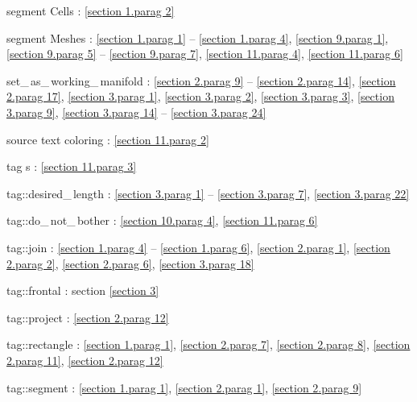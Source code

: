 \documentclass[a4paper]{scrreprt}
\def\numb{}
\newcommand\verm[1]{\textcolor{manif}{#1}}
\renewcommand\tt{\normalfont\ttfamily}
\begin{document}
\noindent
segment {\small\tt \verm{Cell}}s : \ref{\numb section 1.\numb parag 2}

\noindent
segment {\small\tt \verm{Mesh}}es :
\ref{\numb section 1.\numb parag 1} -- \ref{\numb section 1.\numb parag 4},
\ref{\numb section 9.\numb parag 1}, \ref{\numb section 9.\numb parag 5} --
\ref{\numb section 9.\numb parag 7}, \ref{\numb section 11.\numb parag 4},
\ref{\numb section 11.\numb parag 6}

\noindent
{\small\tt set\_\,as\_\,working\_\,manifold} :
\ref{\numb section 2.\numb parag 9} -- \ref{\numb section 2.\numb parag 14},
\ref{\numb section 2.\numb parag 17}, \ref{\numb section 3.\numb parag 1},
\ref{\numb section 3.\numb parag 2}, \ref{\numb section 3.\numb parag 3},
\ref{\numb section 3.\numb parag 9},
\ref{\numb section 3.\numb parag 14} -- \ref{\numb section 3.\numb parag 24}

\noindent
source text coloring : \ref{\numb section 11.\numb parag 2}

\noindent
{\small\tt\textcolor{tag}{tag}}\hskip0.5pt s : \ref{\numb section 11.\numb parag 3}
  
\noindent
{\small\tt\textcolor{tag}{tag}::desired\_\,length} :
\ref{\numb section 3.\numb parag 1} -- \ref{\numb section 3.\numb parag 7},
\ref{\numb section 3.\numb parag 22}

\noindent
{\small\tt\textcolor{tag}{tag}::do\_\,not\_\,bother} :
\ref{\numb section 10.\numb parag 4}, \ref{\numb section 11.\numb parag 6}

\noindent
{\small\tt\textcolor{tag}{tag}::join} :
\ref{\numb section 1.\numb parag 4} -- \ref{\numb section 1.\numb parag 6},
\ref{\numb section 2.\numb parag 1}, \ref{\numb section 2.\numb parag 2},
\ref{\numb section 2.\numb parag 6}, \ref{\numb section 3.\numb parag 18}

\noindent
{\small\tt\textcolor{tag}{tag}::frontal} : section \ref{\numb section 3}
  
\noindent
{\small\tt\textcolor{tag}{tag}::project} : \ref{\numb section 2.\numb parag 12}
  
\noindent
{\small\tt\textcolor{tag}{tag}::rectangle} : \ref{\numb section 1.\numb parag 1},
\ref{\numb section 2.\numb parag 7}, \ref{\numb section 2.\numb parag 8},
\ref{\numb section 2.\numb parag 11}, \ref{\numb section 2.\numb parag 12}

\noindent
{\small\tt\textcolor{tag}{tag}::segment} : \ref{\numb section 1.\numb parag 1}, 
\ref{\numb section 2.\numb parag 1}, \ref{\numb section 2.\numb parag 9}
\end{document}
